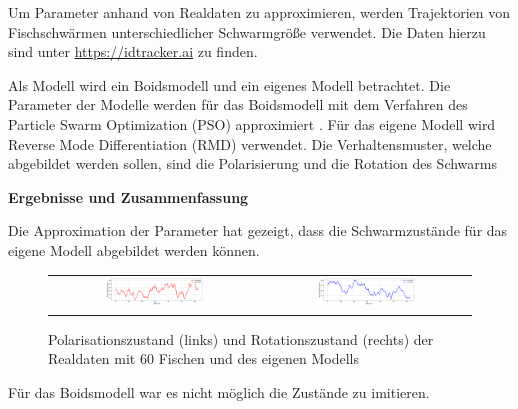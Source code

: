 \begin{refsection}
Um Parameter anhand von Realdaten zu approximieren, werden Trajektorien von Fischschwärmen unterschiedlicher Schwarmgröße verwendet.
Die Daten hierzu sind unter \url{https://idtracker.ai} zu finden.

Als Modell wird ein Boidsmodell \cite{Couzin2002CollectiveMA} und ein eigenes Modell betrachtet. Die Parameter der Modelle werden für das Boidsmodell mit dem Verfahren des Particle Swarm Optimization (PSO) approximiert \cite{PSO_Overview}. Für das eigene Modell wird Reverse Mode Differentiation (RMD) \cite{DBLP:journals/corr/abs-1811-05031} verwendet. Die Verhaltensmuster, welche abgebildet werden sollen, sind die Polarisierung und die Rotation des Schwarms \cite{Tunstrm2013CollectiveSM}

\vspace*{3pt}
\textbf{\textsf{Ergebnisse und Zusammenfassung}}
\vspace*{3pt}

Die Approximation der Parameter hat gezeigt, dass die Schwarmzustände für das eigene Modell abgebildet werden können.

 
\begin{figure}[H]
\centering
\begin{tabular}{cc}
\includegraphics[width=0.5\textwidth]{figures/Experimente/Realdaten/PWD_60Fische_POL.png} &
\includegraphics[width=0.5\textwidth]{figures/Experimente/Realdaten/PWD_60Fische_ROT.png} 
\end{tabular}
\caption{Polarisationszustand (links) und Rotationszustand (rechts) der Realdaten mit 60 Fischen und des eigenen Modells\label{fig:60Fisch_rot_EIGEN}}
\end{figure}

Für das Boidsmodell war es nicht möglich die Zustände zu imitieren. 


\end{refsection}
